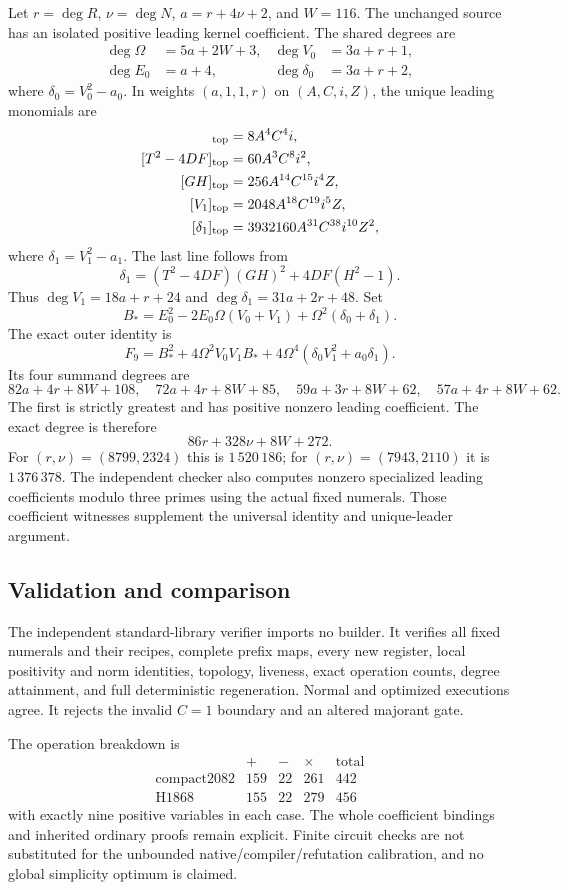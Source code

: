 Let $r=\deg R$, $\nu=\deg N$, $a=r+4\nu+2$, and $W=116$.
The unchanged source has an isolated positive leading kernel coefficient.
The shared degrees are
\begin{align*}
 \deg\Omega&=5a+2W+3,&\deg V_0&=3a+r+1,\\
 \deg E_0&=a+4,&\deg\delta_0&=3a+r+2,
\end{align*}
where $\delta_0=V_0^2-a_0$.
In weights $(a,1,1,r)$ on $(A,C,i,Z)$, the unique leading monomials are
\begin{align*}
 [T]_{\rm top}&=8A^4C^4i,\\
 [T^2-4DF]_{\rm top}&=60A^3C^8i^2,\\
 [GH]_{\rm top}&=256A^{14}C^{15}i^4Z,\\
 [V_1]_{\rm top}&=2048A^{18}C^{19}i^5Z,\\
 [\delta_1]_{\rm top}&=3932160A^{31}C^{38}i^{10}Z^2,
\end{align*}
where $\delta_1=V_1^2-a_1$. The last line follows from
\[
 \delta_1=(T^2-4DF)(GH)^2+4DF(H^2-1).
\]
Thus $\deg V_1=18a+r+24$ and $\deg\delta_1=31a+2r+48$.
Set
\[
 B_* = E_0^2-2E_0\Omega(V_0+V_1)+\Omega^2(\delta_0+\delta_1).
\]
The exact outer identity is
\[
 F_9=B_*^2+4\Omega^2V_0V_1B_*
       +4\Omega^4(\delta_0V_1^2+a_0\delta_1).
\]
Its four summand degrees are
\[
 82a+4r+8W+108,\quad72a+4r+8W+85,\quad
 59a+3r+8W+62,\quad57a+4r+8W+62.
\]
The first is strictly greatest and has positive nonzero leading coefficient.
The exact degree is therefore
\[
                        86r+328\nu+8W+272.
\]
For $(r,\nu)=(8799,2324)$ this is $1\,520\,186$;
for $(r,\nu)=(7943,2110)$ it is $1\,376\,378$.
The independent checker also computes nonzero specialized leading
coefficients modulo three primes using the actual fixed numerals.
Those coefficient witnesses supplement the universal identity and
unique-leader argument.

\subsection{Validation and comparison}

The independent standard-library verifier imports no builder. It verifies
all fixed numerals and their recipes, complete prefix maps, every new
register, local positivity and norm identities, topology, liveness, exact
operation counts, degree attainment, and full deterministic regeneration.
Normal and optimized executions agree. It rejects the invalid $C=1$
boundary and an altered majorant gate.

The operation breakdown is
\[
\begin{array}{c|rrrr}
 &+&-&\times&\text{total}\\ \hline
 \text{compact2082}&159&22&261&442\\
 \text{H1868}&155&22&279&456
\end{array}
\]
with exactly nine positive variables in each case. The whole coefficient
bindings and inherited ordinary proofs remain explicit. Finite circuit
checks are not substituted for the unbounded native/compiler/refutation
calibration, and no global simplicity optimum is claimed.
